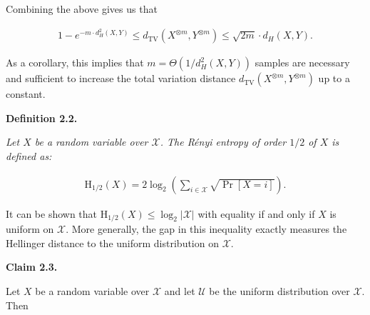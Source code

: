 


Combining the above gives us that\par


\[\begin{gathered}
1-e^{-m\cdot d_{H}^{2}(X,Y)}\leq d_{\mathrm{TV}}(X^{\otimes m},Y^{\otimes m})\leq\sqrt{2m}\cdot d_{H}(X,Y).
\end{gathered}\]




As a corollary, this implies that $m=\Theta(1/d_{H}^{2}(X,Y))$ samples are necessary and sufficient to increase the total variation distance $d_{\mathrm{TV}}(X^{\otimes m},Y^{\otimes m})$ up to a constant.\par





\par\medskip\noindent\textbf{
\textbf{Definition 2.2}\textbf{.}
}\par



\emph{Let $X$ be a random variable over $\mathcal{X}$. The Rényi entropy of order $1/2$ of $X$ is defined as:}\par


\[\begin{gathered}
\mathrm{H}_{1/2}(X)=2\log_{2}\left(\sum_{i\in\mathcal{X}}\sqrt{\Pr[X=i]}\right).
\end{gathered}\]






It can be shown that $\mathrm{H}_{1/2}(X)\leq\log_{2}|\mathcal{X}|$ with equality if and only if $X$ is uniform on $\mathcal{X}$. More generally, the gap in this inequality exactly measures the Hellinger distance to the uniform distribution on $\mathcal{X}$.\par





\par\medskip\noindent\textbf{
Claim 2.3. 
}\par



Let $X$ be a random variable over $\mathcal{X}$ and let $\mathcal{U}$ be the uniform distribution over $\mathcal{X}$. Then\par


